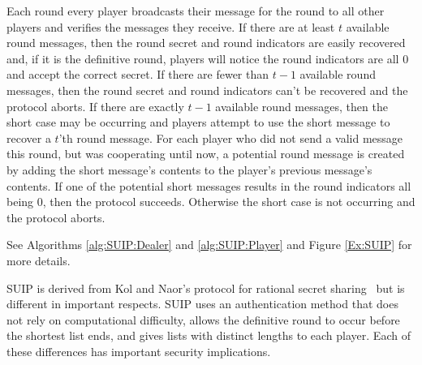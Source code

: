 \documentclass[12pt]{dalcsthesis}
\begin{document}
Each round every player broadcasts their message for the round to all other players and verifies the messages they receive. If there are at least $t$ available round messages, then the round secret and round indicators are easily recovered and, if it is the definitive round, players will notice the round indicators are all $0$ and accept the correct secret. If there are fewer than $t-1$ available round messages, then the round secret and round indicators can't be recovered and the protocol aborts. If there are exactly $t-1$ available round messages, then the short case may be occurring and players attempt to use the short message to recover a $t$'th round message. For each player who did not send a valid message this round, but was cooperating until now, a potential round message is created by adding the short message's contents to the player's previous message's contents. If one of the potential short messages results in the round indicators all being 0, then the protocol succeeds. Otherwise the short case is not occurring and the protocol aborts.

See Algorithms \ref{alg:SUIP:Dealer} and \ref{alg:SUIP:Player} and Figure \ref{Ex:SUIP} for more details.

SUIP is derived from Kol and Naor's protocol for rational secret sharing~\cite{kol08} but is different in important respects. SUIP uses an authentication method that does not rely on computational difficulty, allows the definitive round to occur before the shortest list ends, and gives lists with distinct lengths to each player. Each of these differences has important security implications.
\end{document}
